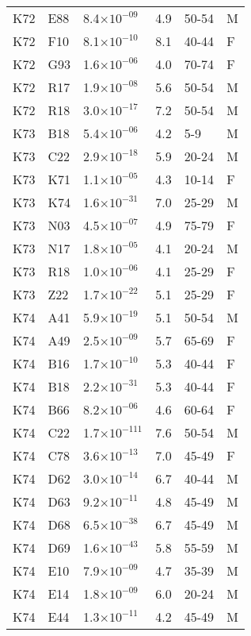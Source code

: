 \begin{longtable}{lllrll}
   K72 & E88 & 8.4$\times10^{-09}$ & 4.9 & 50-54 & M \\ 
   K72 & F10 & 8.1$\times10^{-10}$ & 8.1 & 40-44 & F \\ 
   K72 & G93 & 1.6$\times10^{-06}$ & 4.0 & 70-74 & F \\ 
   K72 & R17 & 1.9$\times10^{-08}$ & 5.6 & 50-54 & M \\ 
   K72 & R18 & 3.0$\times10^{-17}$ & 7.2 & 50-54 & M \\ 
   K73 & B18 & 5.4$\times10^{-06}$ & 4.2 & 5-9 & M \\ 
   K73 & C22 & 2.9$\times10^{-18}$ & 5.9 & 20-24 & M \\ 
   K73 & K71 & 1.1$\times10^{-05}$ & 4.3 & 10-14 & F \\ 
   K73 & K74 & 1.6$\times10^{-31}$ & 7.0 & 25-29 & M \\ 
   K73 & N03 & 4.5$\times10^{-07}$ & 4.9 & 75-79 & F \\ 
   K73 & N17 & 1.8$\times10^{-05}$ & 4.1 & 20-24 & M \\ 
   K73 & R18 & 1.0$\times10^{-06}$ & 4.1 & 25-29 & F \\ 
   K73 & Z22 & 1.7$\times10^{-22}$ & 5.1 & 25-29 & F \\ 
   K74 & A41 & 5.9$\times10^{-19}$ & 5.1 & 50-54 & M \\ 
   K74 & A49 & 2.5$\times10^{-09}$ & 5.7 & 65-69 & F \\ 
   K74 & B16 & 1.7$\times10^{-10}$ & 5.3 & 40-44 & F \\ 
   K74 & B18 & 2.2$\times10^{-31}$ & 5.3 & 40-44 & F \\ 
   K74 & B66 & 8.2$\times10^{-06}$ & 4.6 & 60-64 & F \\ 
   K74 & C22 & 1.7$\times10^{-111}$ & 7.6 & 50-54 & M \\ 
   K74 & C78 & 3.6$\times10^{-13}$ & 7.0 & 45-49 & F \\ 
   K74 & D62 & 3.0$\times10^{-14}$ & 6.7 & 40-44 & M \\ 
   K74 & D63 & 9.2$\times10^{-11}$ & 4.8 & 45-49 & M \\ 
   K74 & D68 & 6.5$\times10^{-38}$ & 6.7 & 45-49 & M \\ 
   K74 & D69 & 1.6$\times10^{-43}$ & 5.8 & 55-59 & M \\ 
   K74 & E10 & 7.9$\times10^{-09}$ & 4.7 & 35-39 & M \\ 
   K74 & E14 & 1.8$\times10^{-09}$ & 6.0 & 20-24 & M \\ 
   K74 & E44 & 1.3$\times10^{-11}$ & 4.2 & 45-49 & M \\ 

\end{longtable}
